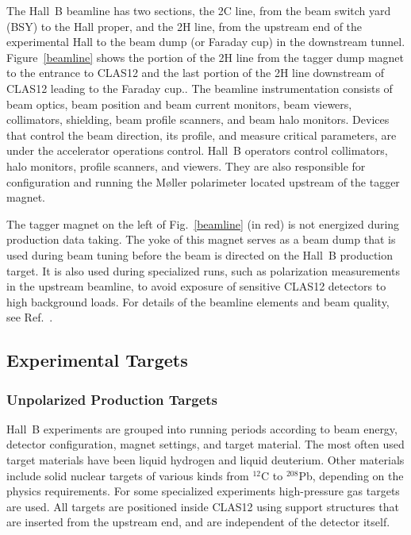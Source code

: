 \documentclass[final,3p,twocolumn]{elsarticle}
\begin{document}
The Hall~B beamline has two sections, the 2C line, from the beam switch yard (BSY) to the Hall proper, and the 2H
line, from the upstream end of the experimental Hall to the beam dump (or Faraday cup) in the downstream tunnel.
Figure~\ref{beamline} shows the portion of the 2H line from the tagger dump magnet to the entrance to CLAS12 and
the last portion of the 2H line downstream of CLAS12 leading to the Faraday cup.. The beamline instrumentation
consists of beam optics, beam position and beam current monitors, beam viewers, collimators,  shielding, beam
profile scanners, and beam halo monitors. Devices that control the beam direction, its profile, and  measure critical
parameters, are under the accelerator operations control. Hall~B operators control collimators, halo monitors,
profile scanners, and viewers. They are also responsible for configuration and running the M{\o}ller polarimeter
located upstream of the tagger magnet.

The tagger magnet on the left of Fig.~\ref{beamline} (in red) is not energized during production data taking. The
yoke of this magnet serves as a beam dump that is used during beam tuning before the beam is directed on the
Hall~B production target. It is also used during specialized runs, such as polarization measurements in the upstream
beamline, to avoid exposure of sensitive CLAS12 detectors to high background loads. For details of the beamline
elements and beam quality, see Ref.~\cite{beamline}.  

\subsection{Experimental Targets}

\subsubsection{Unpolarized Production Targets} 

Hall~B experiments are grouped into running periods according to beam energy, detector configuration, magnet
settings, and target material. The most often used target materials have been liquid hydrogen and liquid deuterium.
Other materials include solid nuclear targets of various kinds from $^{12}$C to $^{208}$Pb, depending on the physics
requirements. For some specialized experiments high-pressure gas targets are used. All targets are positioned
inside CLAS12 using support structures that are inserted from the upstream end, and are independent of the
detector itself. 
\end{document}
